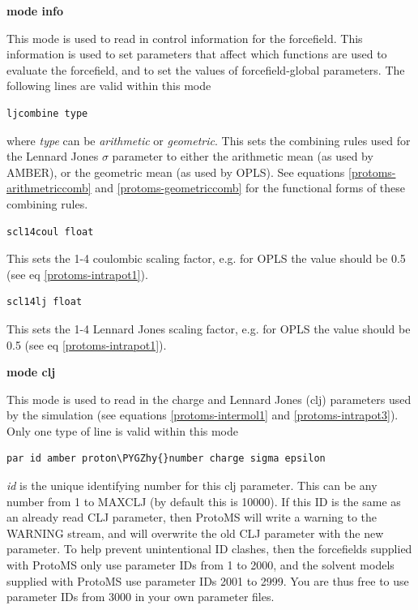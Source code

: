 \documentclass[letterpaper,10pt,english]{sphinxmanual}
\def\PYGZhy{\char`\-}
\begin{document}
\textbf{mode info}

This mode is used to read in control information for the forcefield. This information is used to set parameters that affect which functions are used to evaluate the forcefield, and to set the values of forcefield-global parameters. The following lines are valid within this mode

\begin{Verbatim}[frame=single,commandchars=\\\{\}]
ljcombine type
\end{Verbatim}

where \emph{type} can be \emph{arithmetic} or \emph{geometric}. This sets the combining rules used for the Lennard Jones \(\sigma\) parameter to either the arithmetic mean (as used by AMBER), or the geometric mean (as used by OPLS). See equations \eqref{protoms-arithmetriccomb} and \eqref{protoms-geometriccomb} for the functional forms of these combining rules.

\begin{Verbatim}[frame=single,commandchars=\\\{\}]
scl14coul float
\end{Verbatim}

This sets the 1-4 coulombic scaling factor, e.g. for OPLS the value should be 0.5 (see eq \eqref{protoms-intrapot1}).

\begin{Verbatim}[frame=single,commandchars=\\\{\}]
scl14lj float
\end{Verbatim}

This sets the 1-4 Lennard Jones scaling factor, e.g. for OPLS the value should be 0.5 (see eq \eqref{protoms-intrapot1}).

\textbf{mode clj}

This mode is used to read in the charge and Lennard Jones (clj) parameters used by the simulation (see equations \eqref{protoms-intermol1} and \eqref{protoms-intrapot3}). Only one type of line is valid within this mode

\begin{Verbatim}[frame=single,commandchars=\\\{\}]
par id amber proton\PYGZhy{}number charge sigma epsilon
\end{Verbatim}

\emph{id} is the unique identifying number for this clj parameter. This can be any number from 1 to MAXCLJ (by default this is 10000). If this ID is the same as an already read CLJ parameter, then ProtoMS will write a warning to the WARNING stream, and will overwrite the old CLJ parameter with the new parameter. To help prevent unintentional ID clashes, then the forcefields supplied with ProtoMS only use parameter IDs from 1 to 2000, and the solvent models supplied with ProtoMS use parameter IDs 2001 to 2999. You are thus free to use parameter IDs from 3000 in your own parameter files.
\end{document}
